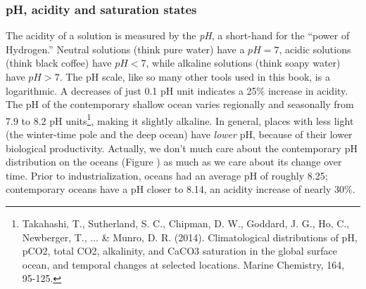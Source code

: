 \subsubsection{pH, acidity and saturation states}
The acidity of a solution is measured by the \emph{pH}, a short-hand for the ``power of Hydrogen.'' Neutral solutions (think pure water) have a $pH=7$, acidic solutions (think black coffee) have $pH<7$, while alkaline solutions (think soapy water) have $pH>7$. The pH scale, like so many other tools used in this book, is a logarithmic. A decreases of just 0.1 pH unit indicates a 25\% increase in acidity. The pH of the contemporary shallow ocean varies regionally and seasonally from 7.9 to 8.2 pH units\footnote{Takahashi, T., Sutherland, S. C., Chipman, D. W., Goddard, J. G., Ho, C., Newberger, T., ... \& Munro, D. R. (2014). Climatological distributions of pH, pCO2, total CO2, alkalinity, and CaCO3 saturation in the global surface ocean, and temporal changes at selected locations. Marine Chemistry, 164, 95-125.}, making it slightly alkaline. In general, places with less light (the winter-time pole and the deep ocean) have \emph{lower} pH, because of their lower biological productivity. Actually, we don't much care about the contemporary pH distribution on the oceans (Figure \label{fig:ph_map}) as much as we care about its change over time. Prior to industrialization, oceans had an average pH of roughly 8.25; contemporary oceans have a pH closer to 8.14, an acidity increase of nearly 30\%. \\
